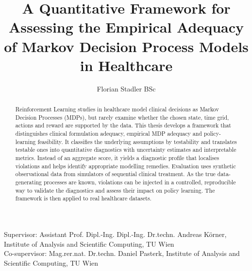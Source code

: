 \documentclass[runningheads]{llncs}
\begin{document}
%
\title{A Quantitative Framework for Assessing the Empirical Adequacy of Markov Decision Process Models in Healthcare}
%
%
\author{Florian Stadler BSc}
%
%
%
\maketitle
%
Supervisor: Assistant Prof. Dipl.-Ing. Dipl.-Ing. Dr.techn. Andreas K\"orner, Institute of Analysis and Scientific Computing, TU Wien \\
Co-supervisor: Mag.rer.nat. Dr.techn. Daniel Pasterk, Institute of Analysis and Scientific Computing, TU Wien

\begin{abstract}
Reinforcement Learning studies in healthcare model clinical decisions as Markov Decision Processes (MDPs), but rarely examine whether the chosen state, time grid, actions and reward are supported by the data. This thesis develops a framework that distinguishes clinical formulation adequacy, empirical MDP adequacy and policy-learning feasibility. It classifies the underlying assumptions by testability and translates testable ones into quantitative diagnostics with uncertainty estimates and interpretable metrics. Instead of an aggregate score, it yields a diagnostic profile that localises violations and helps identify appropriate modelling remedies. Evaluation uses synthetic observational data from simulators of sequential clinical treatment. As the true data-generating processes are known, violations can be injected in a controlled, reproducible way to validate the diagnostics and assess their impact on policy learning. The framework is then applied to real healthcare datasets.

\end{abstract}
%
\end{document}
